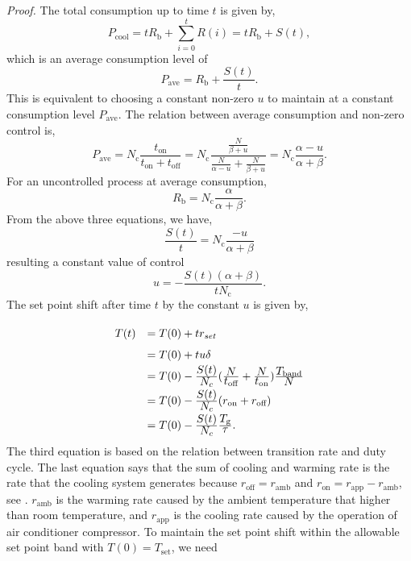\documentclass[journal]{IEEEtran}
\begin{document}
\textit{Proof.} The total consumption up to time $t$ is given by,
\begin{equation}
P_{\textrm{cool}}=tR_{\textrm{b}}+\sum\limits_{i=0}^{t}R(i)=tR_{\textrm{b}}+S(t),
\end{equation}
which is an average consumption level of 
\begin{equation}
P_{\textrm{ave}}=R_{\textrm{b}}+\frac{S(t)}{t}.
\end{equation}
This is equivalent to choosing a constant non-zero $u$ to maintain at a constant consumption level $P_{\textrm{ave}}$. The relation between average consumption and non-zero control is, 
\begin{equation}
P_{\textrm{ave}}=N_{\textrm{c}}\frac{t_{\textrm{on}}}{t_{\textrm{on}}+t_{\textrm{off}}}=N_{\textrm{c}}\frac{\frac{N}{\beta+u}}{\frac{N}{\alpha-u}+\frac{N}{\beta+u}}=N_{\textrm{c}}\frac{\alpha-u}{\alpha+\beta}.
\end{equation}
For an uncontrolled process at average consumption,
\begin{equation}
R_{\textrm{b}}=N_{\textrm{c}}\frac{\alpha}{\alpha+\beta}.
\end{equation}
From the above three equations, we have,
\begin{equation}
\frac{S(t)}{t}=N_{\textrm{c}}\frac{-u}{\alpha+\beta}
\end{equation}
resulting a constant value of control
\begin{equation}
\label{constctrl}
u=-\frac{S(t)(\alpha+\beta)}{tN_{\textrm{c}}}.
\end{equation}
The set point shift after time $t$ by the constant $u$ is given by,
\begin{equation}
\setlength{\extrarowheight}{7pt}
\begin{array}{ll}
T(t) & =T(0)+tr_{set}\\
&=T(0)+tu\delta \\
&=T(0)-\frac{\displaystyle S(t)}{\displaystyle N_{c}}(\frac{\displaystyle N}{\displaystyle t_{\textrm{off}}}+\frac{\displaystyle N}{\displaystyle t_{\textrm{on}}})\frac{\displaystyle T_{\textrm{band}}}{\displaystyle N}\\
&=T(0)-\frac{\displaystyle S(t)}{\displaystyle N_{c}}(r_{\textrm{on}}+r_{\textrm{off}})\\
&=T(0)-\frac{\displaystyle S(t)}{\displaystyle N_{c}}\frac{\displaystyle T_{\textrm{g}}}{\displaystyle\tau}.
\end{array}
\end{equation}
The third equation is based on the relation between transition rate and duty cycle. The last equation says that the sum of cooling and warming rate is the rate that the cooling system generates because $r_{\textrm{off}}=r_{\textrm{amb}}$ and $r_{\textrm{on}}=r_{\textrm{app}}-r_{\textrm{amb}}$, see \cite{bowen}. $r_{\textrm{amb}}$ is the warming rate caused by the ambient temperature that higher than room temperature, and $r_{\textrm{app}}$ is the cooling rate caused by the operation of air conditioner compressor. To maintain the set point shift within the allowable set point band with $T(0)=T_{\textrm{set}}$, we need
\end{document}
